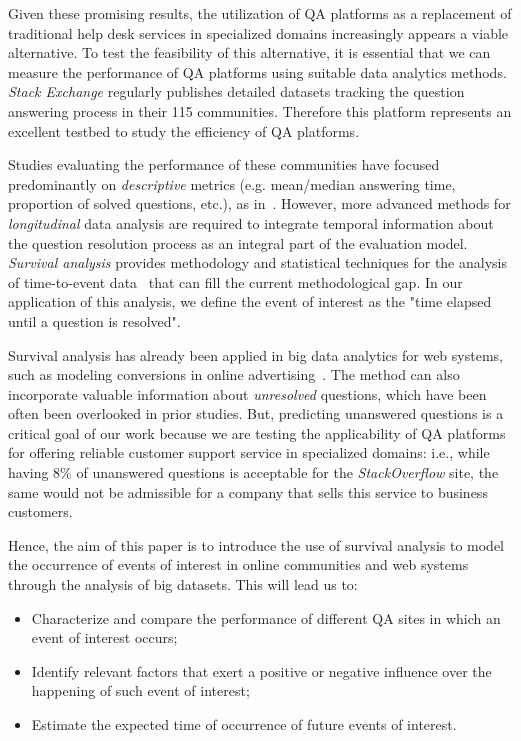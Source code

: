 \documentclass{chi2012}
\begin{document}
Given these promising results, the utilization of QA platforms
as a replacement of traditional help desk services in specialized
domains increasingly appears a viable alternative. To test the feasibility of this alternative, it is essential that we can measure the performance of QA platforms using suitable data analytics methods. \textit{Stack Exchange} regularly publishes 
detailed datasets tracking the question answering process 
in their 115 communities. Therefore this platform represents an excellent testbed to study 
the efficiency of QA platforms.

Studies evaluating the performance of these communities have
focused predominantly on \textit{descriptive} metrics (e.g. mean/median answering time, proportion 
of solved questions, etc.), as in~\cite{mamykina2011}. However, more advanced methods for \textit{longitudinal} data 
analysis are required to integrate temporal information about the question 
resolution process as an integral part of the evaluation model. \textit{Survival analysis} provides methodology and statistical 
techniques for the analysis of time-to-event data~\cite{hosmer2011} that can
fill the current methodological gap. In our application of this analysis, we define the event of interest as the "time elapsed until a question is resolved". 

Survival analysis has already been applied in big data analytics for web 
systems, such as modeling conversions in online advertising~\cite{chandler2010}.
The method can also incorporate valuable information about \textit{unresolved} 
questions, which have been often been overlooked in prior studies. But, predicting unanswered questions is a critical goal of our work because we are testing the applicability of QA platforms for offering reliable 
customer support service in specialized domains: i.e., while having 8\% 
of unanswered questions is acceptable for the \textit{StackOverflow} site, the same would not be admissible for a company that sells this service to business customers. 

Hence, the aim of this paper is to introduce the use of survival analysis
to model the occurrence of events of interest in online communities and web systems
through the analysis of big datasets. This will lead us to: 
\begin{itemize}
\item Characterize and compare the performance of different QA sites in which an 
event of interest occurs;
\item Identify relevant factors that exert a positive or negative influence over 
the happening of such event of interest; 
\item Estimate the expected time of occurrence of future events of interest.
\end{itemize}
\end{document}
